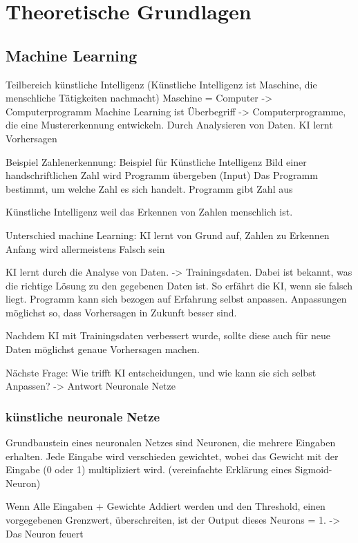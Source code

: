 \chapter{Theoretische Grundlagen}

\section{Machine Learning}
\label{chap:t_ml}
Teilbereich künstliche Intelligenz (Künstliche Intelligenz ist Maschine, die
menschliche Tätigkeiten nachmacht) Maschine = Computer -> Computerprogramm
Machine Learning ist Überbegriff -> Computerprogramme, die eine Mustererkennung
entwickeln. Durch Analysieren von Daten. KI lernt Vorhersagen

Beispiel Zahlenerkennung: Beispiel für Künstliche Intelligenz Bild einer
handschriftlichen Zahl wird Programm übergeben (Input) Das Programm bestimmt, um
welche Zahl es sich handelt. Programm gibt Zahl aus

Künstliche Intelligenz weil das Erkennen von Zahlen menschlich ist.

Unterschied machine Learning: KI lernt von Grund auf, Zahlen zu Erkennen Anfang
wird allermeistens Falsch sein

KI lernt durch die Analyse von Daten. -> Trainingsdaten. Dabei ist bekannt, was
die richtige Lösung zu den gegebenen Daten ist. So erfährt die KI, wenn sie
falsch liegt. Programm kann sich bezogen auf Erfahrung selbst anpassen.
Anpassungen möglichst so, dass Vorhersagen in Zukunft besser sind.

Nachdem KI mit Trainingsdaten verbessert wurde, sollte diese auch für neue Daten
möglichst genaue Vorhersagen machen.

Nächste Frage: Wie trifft KI entscheidungen, und wie kann sie sich selbst
Anpassen? -> Antwort Neuronale Netze


\subsection*{künstliche neuronale Netze}

Grundbaustein eines neuronalen Netzes sind  Neuronen, die mehrere Eingaben
erhalten. Jede Eingabe wird verschieden gewichtet, wobei das Gewicht mit der
Eingabe (0 oder 1) multipliziert wird. (vereinfachte Erklärung eines
Sigmoid-Neuron)

Wenn Alle Eingaben + Gewichte Addiert werden und den Threshold, einen
vorgegebenen Grenzwert, überschreiten, ist der Output dieses Neurons = 1. -> Das
Neuron feuert

